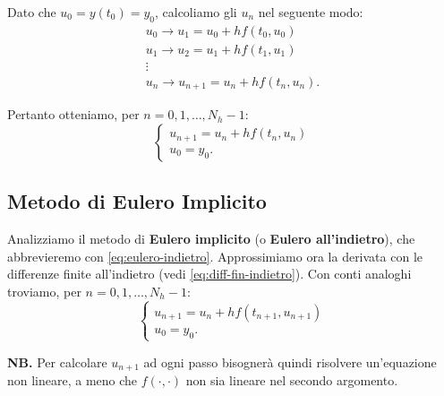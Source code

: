 Dato che $u_{0} =y( t_{0}) =y_{0}$, calcoliamo gli $u_{n}$ nel seguente modo:
\begin{gather*}
u_{0}\rightarrow u_{1} =u_{0} +hf( t_{0} ,u_{0})\\
u_{1}\rightarrow u_{2} =u_{1} +hf( t_{1} ,u_{1})\\
\vdots \\
u_{n}\rightarrow u_{n+1} =u_{n} +hf( t_{n} ,u_{n}).
\end{gather*}

Pertanto otteniamo, per $n=0,1,\dotsc ,N_{h} -1$:
\begin{equation}\tag{EE}
\begin{cases}
u_{n+1} =u_{n} +hf( t_{n} ,u_{n})\\
u_{0} =y_{0}.
\end{cases}
\label{eq:eulero-avanti}
\end{equation}

\subsection{Metodo di Eulero Implicito}
Analizziamo il metodo di \textbf{Eulero implicito} (o \textbf{Eulero all'indietro}), che abbrevieremo con \eqref{eq:eulero-indietro}.
Approssimiamo ora la derivata con le differenze finite all'indietro (vedi \eqref{eq:diff-fin-indietro}).
Con conti analoghi troviamo, per $n=0,1,\dotsc ,N_{h} -1$:
\begin{equation}\tag{EI}
\begin{cases}
u_{n+1} =u_{n} +hf( t_{n+1} ,u_{n+1})\\
u_{0} =y_{0}.
\end{cases}
\label{eq:eulero-indietro}
\end{equation}

\textbf{NB.}
Per calcolare $u_{n+1}$ ad ogni passo bisognerà quindi risolvere un'equazione non lineare, a meno che $f( \cdot ,\cdot )$ non sia lineare nel secondo argomento.

